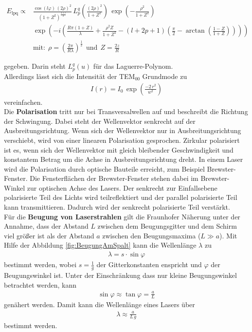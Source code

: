 \begin{align*}
	E_\text{lpq} \propto &\frac{\cos(l\varphi)\,(2\rho)^2}{(1+Z^2)^\frac{1+l}{2}}\, L_p^q\left(\frac{(2\rho)^2}{1+Z^2}\right)\,\exp \left(-\frac{\rho^2}{1+Z^2} \right) \\
	&\exp \left(-i\left(\frac{R\pi(1+Z)}{\lambda}+ \frac{\rho^2Z}{1+Z^2}- (l+2p+1)\left(\frac{\pi}{2}-\arctan \left(\frac{1-Z}{1+Z} \right) \right)\right)\right) \\
	&\text{mit:}\ \ \rho = \left(\frac{2\pi}{R\lambda} \right)^\frac{1}{2} \ \ \text{und} \ \ Z = \frac{2z}{R}
\end{align*}

gegeben. Darin steht $L_p^q(u)$ für das Laguerre-Polynom. \\
Allerdings lässt sich die Intensität der TEM$_{00}$ Grundmode zu
\begin{align}
	I(r) = I_0\,\exp \left(\frac{-2\,r^2}{w^2} \right)
	\label{eqn:Grund}
\end{align}
vereinfachen. \\
Die \textbf{Polarisation} tritt nur bei Transversalwellen auf und beschreibt die Richtung der Schwingung. Dabei steht der Wellenvektor senkrecht auf der Ausbreitungsrichtung. Wenn sich der Wellenvektor nur in Ausbreitungsrichtung verschiebt, wird von einer linearen Polarisation gesprochen. Zirkular polarisiert ist es, wenn sich der Wellenvektor mit gleich bleibender Geschwindigkeit und konstantem Betrag um die Achse in Ausbreitungsrichtung dreht. In einem Laser wird die Polarisation durch optische Bauteile erreicht, zum Beispiel Brewster-Fenster. Die Fensterflächen der Brewster-Fenster stehen dabei im Brewster-Winkel zur optischen Achse des Lasers. Der senkrecht zur Einfallsebene polarisierte Teil des Lichts wird teilreflektiert und der parallel polarisierte Teil kann transmittieren. Dadurch wird der senkrecht polarisierte Teil verstärkt. \\
Für die \textbf{Beugung von Laserstrahlen} gilt die Fraunhofer Näherung unter der Annahme, dass der Abstand $L$ zwischen dem Beugungsgitter und dem Schirm viel größer ist als der Abstand $a$ zwischen den Beugungsmaxima ($L \gg a$). Mit Hilfe der Abbildung \eqref{fig:BeugungAmSpalt} kann die Wellenlänge $\lambda$ zu
\begin{align}
	\lambda = s\cdot\sin\varphi
	\label{eqn:lambda}
\end{align}
bestimmt werden, wobei $s = \frac{1}{g}$ der Gitterkonstanten enspricht und $\varphi$ der Beugungswinkel ist. Unter der Einschränkung dass nur kleine Beugungswinkel betrachtet werden, kann
\begin{align}
	\sin\varphi \approx \tan\varphi = \frac{a}{L}
\end{align}
genähert werden. Damit kann die Wellenlänge eines Lasers über
\begin{align}
	\lambda \approx \frac{a}{L\,g}
	\label{eqn:lambda}
\end{align}
bestimmt werden.

